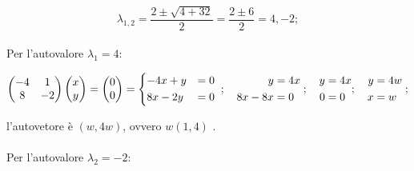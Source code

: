 \documentclass[a4paper]{report}
\begin{document}
        \[
                \lambda_{1,2} = \frac{2 \pm \sqrt{4 + 32}}{2} = \frac{2 \pm 6}{2} = 4, -2;
        \]

        \paragraph{}
        Per l'autovalore $\lambda_1 = 4$:

        \[
                \begin{pmatrix}
                        -4 & 1 \\
                        8  & -2
                \end{pmatrix} \begin{pmatrix}
                        x \\
                        y
                \end{pmatrix} = \begin{pmatrix}
                        0 \\
                        0
                \end{pmatrix} = \begin{dcases}
                        -4x + y & = 0 \\
                        8x - 2y & = 0
                \end{dcases}\;; \quad \begin{aligned}
                        y & = 4x \\
                        8x - 8x & = 0
                \end{aligned}\;; \quad \begin{aligned}
                        y & = 4x \\
                        0 & = 0
                \end{aligned}; \quad \begin{aligned}
                        y & = 4w \\
                        x & = w
                \end{aligned}\;;
        \]

        l'autovetore \`{e} $(w, 4w)$, ovvero $w(1, 4)$ .


        \paragraph{}
        Per l'autovalore $\lambda_2 = - 2$:
\end{document}
